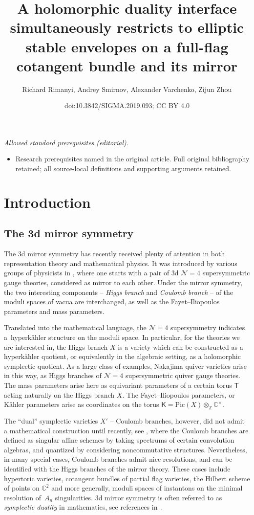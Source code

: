 \documentclass[10pt,a4paper]{amsart}
\title{A holomorphic duality interface simultaneously restricts to elliptic stable envelopes on a full-flag cotangent bundle and its mirror}
\author{Richard Rimanyi, Andrey Smirnov, Alexander Varchenko, Zijun Zhou}
\date{doi:10.3842/SIGMA.2019.093; CC BY 4.0}
\newcommand{\bK}{\mathsf{K}}
\def\Z{{\mathbb Z}}
\def\C{{\mathbb C}}
\newcommand{\bT}{\mathsf{T}}
\numberwithin{equation}{section}
\begin{document}
\maketitle
\noindent\textit{Allowed standard prerequisites (editorial).}\begin{itemize}
\item Research prerequisites named in the original article. Full original bibliography retained; all source-local definitions and supporting arguments retained.
\end{itemize}\medskip
\section{Introduction}

\subsection{The 3d mirror symmetry}

The 3d mirror symmetry has recently received plenty of attention in both representation theory and mathematical physics. It was introduced by various groups of physicists in \cite{BDG, BDGH, PhysMir2, PhysMir1, Ga-Wit, HW, PhysMir3}, where one starts with a pair of 3d $\mathcal{N} = 4$ supersymmetric gauge theories, considered as mirror to each other. Under the mirror symmetry, the two interesting components -- \emph{Higgs branch} and \emph{Coulomb branch} -- of the moduli spaces of vacua are interchanged, as well as the Fayet--Iliopoulos parameters and mass parameters.

Translated into the mathematical language, the $\mathcal{N} = 4$ supersymmetry indicates a~hyperk\"ahler structure on the moduli space. In particular, for the theories we are interested in, the Higgs branch $X$ is a variety which can be constructed as a hyperk\"ahler quotient, or equivalently in the algebraic setting, as a holomorphic symplectic quotient. As a large class of examples, Nakajima quiver varieties arise in this way, as Higgs branches of $\mathcal{N}=4$ supersymmetric quiver gauge theories. The mass parameters arise here as equivariant parameters of a certain torus $\bT$ acting naturally on the Higgs branch $X$. The Fayet--Iliopoulos parameters, or K\"ahler parameters arise as coordinates on the torus $\bK=\mathrm{Pic}(X)\otimes_{\Z} \C^{\times}$.

The ``dual'' symplectic varieties $X'$ -- Coulomb branches, however, did not admit a mathematical construction until recently,
see \cite{BFN2, NakCoulomb1, Coulomb1}, where the Coulomb branches are defined as singular affine schemes by taking spectrums of certain convolution algebras, and quantized by considering noncommutative structures. Nevertheless, in many special cases, Coulomb branches admit nice resolutions, and can be identified with the Higgs branches of the mirror theory. These cases include hypertoric varieties, cotangent bundles of partial flag varieties, the Hilbert scheme of points on $\C^2$ and more generally, moduli spaces of instantons on the minimal resolution of~$A_n$ singularities. 3d mirror symmetry is often referred to as \emph{symplectic duality} in mathematics, see references in~\cite{BLPW, matdu}.
\end{document}
